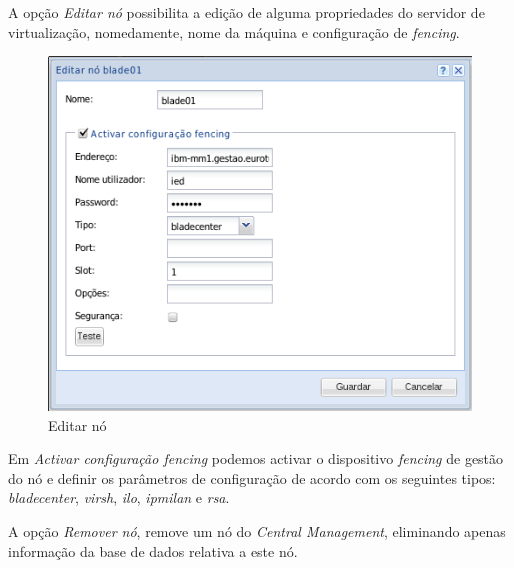 A opção \emph{Editar nó} possibilita a edição de alguma propriedades do servidor de virtualização, nomedamente, nome da máquina e configuração de \emph{fencing}.
\begin{figure}[H]
	\begin{center}
	\includegraphics[scale=0.5]{screenshots/node_edit.png}
	\caption{Editar nó}
	\label{fig:node_edit}
	\end{center}
\end{figure}
\label{para:node_fencing_config}Em \emph{Activar configuração \emph{fencing}} podemos activar o dispositivo \emph{fencing} de gestão do nó e definir os parâmetros de configuração de acordo com os seguintes tipos: \emph{bladecenter}, \emph{virsh}, \emph{ilo}, \emph{ipmilan} e \emph{rsa}.

A opção \emph{Remover nó}, remove um nó do \emph{Central Management}, eliminando apenas informação da base de dados relativa a este nó.

